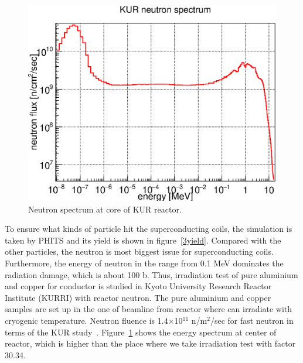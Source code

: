   \begin{figure}[H]
    \centering
	\includegraphics[scale=0.43]{chapter5/fig/neutron.eps}
   \caption{Neutron spectrum at core of KUR reactor.}
   \label{4dpa}
  \end{figure}
To ensure what kinds of particle hit the superconducting coils, the simulation is taken by PHITS and its yield is shown in figure~\ref{3yield}.
Compared with the other particles, the neutron is most biggest issue for superconducting coils.
Furthermore, the energy of neutron in the range from 0.1 MeV dominates the radiation damage, which is about 100 b.
Thus, irradiation test of pure aluminium and copper for conductor is studied in Kyoto University Research Reactor Institute (KURRI) with reactor neutron.
The pure aluminium and copper samples are set up in the one of beamline from reactor where can irradiate with cryogenic temperature.
Neutron fluence is 1.4$\times$10$^{11}$ n/m$^2$/sec for fast neutron in terms of the KUR study~\cite{kur}.
Figure~\ref{4dpa} shows the energy spectrum at center of reactor, which is higher than the place where we take irradiation test with factor 30.34.

